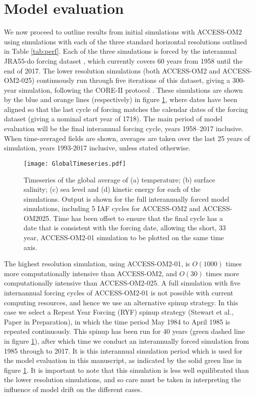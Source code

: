 \documentclass[gmd, manuscript]{copernicus}
\begin{document}
\section{Model evaluation}
We now proceed to outline results from initial simulations with ACCESS-OM2 using simulations with each of the three standard horizontal resolutions outlined in Table \ref{tab:perf}.
Each of the three simulations is forced by the interannual JRA55-do forcing dataset  \citep{TsujinoETAL2018a}, which  currently covers 60 years from 1958 until the end of 2017.
The  lower resolution simulations (both ACCESS-OM2 and ACCESS-OM2-025) continuously run through five iterations of this dataset, giving a 300-year simulation, following the CORE-II protocol \citep[e.g.][]{Danabasoglu:2014}.
These simulations are shown by the blue and orange lines (respectively) in figure \ref{fig:timeseries}, where dates have been aligned so that the last cycle of forcing matches the calendar dates of the forcing dataset (giving a nominal start year of 1718).
The main period of model evaluation will be the final interannual forcing cycle, years 1958--2017 inclusive.
When time-averaged fields are shown, averages are taken over the last 25 years of simulation, years 1993-2017 inclusive, unless stated otherwise.

\begin{figure}[t]
\texttt{[image: GlobalTimeseries.pdf]}
\caption{Timeseries of the global average of (a) temperature; (b) surface salinity; (c) sea level and (d) kinetic energy for each of the simulations. 
Output is shown for the full interannually forced model simulations, including 5 IAF cycles for ACCESS-OM2 and ACCESS-OM2025.
Time has been offset to ensure that the final cycle has a date that is consistent with the forcing date, allowing the short, 33 year, ACCESS-OM2-01 simulation to be plotted on the same time axis.\label{fig:timeseries}}
\end{figure}

The highest resolution simulation, using ACCESS-OM2-01, is $O(1000)$ times more computationally intensive than ACCESS-OM2, and $O(30)$ times more computationally intensive than ACCESS-OM2-025.
A full simulation with five internannual forcing cycles of ACCESS-OM2-01 is not possible with current computing resources, and hence we use an alternative spinup strategy. 
In this case we select a Repeat Year Forcing (RYF) spinup strategy (Stewart et al., Paper in Preparation), in which the time period May 1984 to April 1985 is repeated continuously.
This spinup has been run for 40 years (green dashed line in figure \ref{fig:timeseries}), after which time we conduct an interannually forced simulation from 1985 through to 2017. 
It is this interannual simulation period which is used for the model evaluation in this manuscript, as indicated by the solid green line in figure \ref{fig:timeseries}.
It is important to note that this simulation is less well equilibrated than the lower resolution simulations, and so care must be taken in interpreting the influence of model drift on the different cases.
\end{document}
